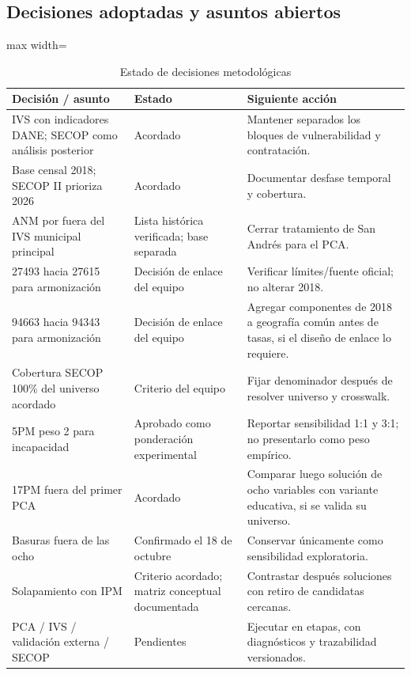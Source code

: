 \subsection{Decisiones adoptadas y asuntos abiertos}

\begin{table}[htbp]
\centering\small
\caption{Estado de decisiones metodológicas}\label{tab:decisiones_pendientes}
\begin{adjustbox}{max width=\textwidth}
\begin{tabular}{@{}p{}p{}p{}@{}}
\toprule
\textbf{Decisión / asunto} & \textbf{Estado} & \textbf{Siguiente acción}\\
\midrule
IVS con indicadores DANE; SECOP como análisis posterior & Acordado & Mantener separados los bloques de vulnerabilidad y contratación. \\
Base censal 2018; SECOP II prioriza 2026 & Acordado & Documentar desfase temporal y cobertura. \\
ANM por fuera del IVS municipal principal & Lista histórica verificada; base separada & Cerrar tratamiento de San Andrés para el PCA. \\
27493 hacia 27615 para armonización & Decisión de enlace del equipo & Verificar límites/fuente oficial; no alterar 2018. \\
94663 hacia 94343 para armonización & Decisión de enlace del equipo & Agregar componentes de 2018 a geografía común antes de tasas, si el diseño de enlace lo requiere. \\
Cobertura SECOP 100\% del universo acordado & Criterio del equipo & Fijar denominador después de resolver universo y crosswalk. \\
5PM peso 2 para incapacidad & Aprobado como ponderación experimental & Reportar sensibilidad 1:1 y 3:1; no presentarlo como peso empírico. \\
17PM fuera del primer PCA & Acordado & Comparar luego solución de ocho variables con variante educativa, si se valida su universo. \\
Basuras fuera de las ocho & Confirmado el 18 de octubre & Conservar únicamente como sensibilidad exploratoria. \\
Solapamiento con IPM & Criterio acordado; matriz conceptual documentada & Contrastar después soluciones con retiro de candidatas cercanas. \\
PCA / IVS / validación externa / SECOP & Pendientes & Ejecutar en etapas, con diagnósticos y trazabilidad versionados. \\
\bottomrule
\end{tabular}
\end{adjustbox}
\end{table}

